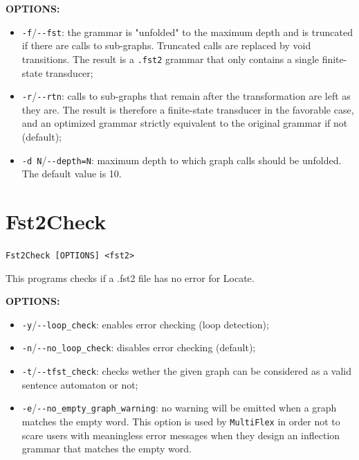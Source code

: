 \bigskip
\noindent \textbf{OPTIONS:}
\begin{itemize}
  \item \verb+-f+/\verb+--fst+: the grammar is "unfolded" to the maximum depth 
  and is truncated if there are calls to
  sub-graphs. Truncated calls are replaced by void transitions. The result is a
  \verb+.fst2+ grammar that only contains a single finite-state transducer;

  \item \verb+-r+/\verb+--rtn+: calls to sub-graphs that remain
  after the transformation are left as they are. The result is therefore a
  finite-state transducer in the favorable case, and an optimized grammar
  strictly equivalent to the original grammar if not (default);

  \item \verb+-d N+/\verb+--depth=N+: maximum depth to which graph calls should 
  be unfolded. The default value is 10.
\end{itemize}







\section{Fst2Check}
\verb+Fst2Check [OPTIONS] <fst2>+

\bigskip
\noindent This programs checks if a .fst2 file has no error for Locate.

\bigskip
\noindent \textbf{OPTIONS:}
\begin{itemize}
  \item \verb+-y+/\verb+--loop_check+: enables error checking (loop
  detection);
  \item \verb+-n+/\verb+--no_loop_check+: disables error checking (default);
  \item \verb+-t+/\verb+--tfst_check+: checks wether the given graph can be
  considered as a valid sentence automaton or not;
  \item \verb+-e+/\verb+--no_empty_graph_warning+: no warning will be emitted
  when a graph matches the empty word. This option is used by \verb+MultiFlex+
  in order not to scare users with meaningless error messages when they design
  an inflection grammar that matches the empty word.
\end{itemize}

